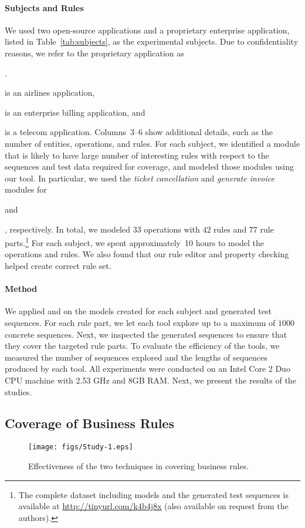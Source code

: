 \paragraph*{Subjects and Rules} We used two open-source applications and a proprietary enterprise application,
listed in Table~\ref{tab:subjects}, as the experimental subjects. Due to
confidentiality reasons, we refer to the proprietary application as
\subject{App}. \subject{Cebu-pacific} is an airlines application,
\subject{jBilling} is an enterprise billing application, and \subject{App} is a
telecom application. 
Columns~3--6 show additional details, such as the number of entities,
operations, and rules. For each subject, we identified a module that is likely
to have large number of interesting rules with respect to the sequences and test
data required for coverage, and modeled those modules using our tool. In
particular, we used the \textit{ticket cancellation} and \textit{generate
  invoice} modules for \subject{Cebu-pacific} and \subject{jBilling},
respectively. In total, we modeled $33$ operations with $42$ rules and $77$ rule
parts.\footnote{The complete dataset including models and the
  generated test sequences is available at \url{http://tinyurl.com/k4b4j8x}
  (also available on request from the authors).} For each subject, we spent
approximately~10 hours to model the operations and rules. We also found that
our rule editor and property checking helped create correct rule set.

\paragraph*{Method} We applied \tool{} and \exhaust{} on the models created for each subject and
generated test sequences. For each rule part, we let each tool explore up to a
maximum of $1000$ concrete sequences. Next, we inspected the generated sequences
to ensure that they cover the targeted rule parts. To evaluate the efficiency of
the tools, we measured the number of sequences explored and the lengths of
sequences produced by each tool.  All experiments were conducted on an Intel
Core 2 Duo CPU machine with 2.53 GHz and 8GB RAM. Next, we present the results
of the studies.

\subsection{Coverage of Business Rules}

\begin{figure}[t]
\centering
\texttt{[image: figs/Study-1.eps]}
\vspace*{-10pt}
\caption{Effectiveness of the two techniques in covering business rules.}
\label{fig:effectiveness}
\end{figure}

